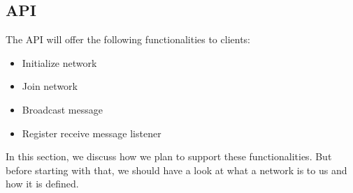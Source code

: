 \subsection{API}
	The API will offer the following functionalities to clients:
	\begin{itemize}
		\item {Initialize network}
		\item {Join network}
		\item {Broadcast message}
		\item {Register receive message listener}
	\end{itemize}
	
	In this section, we discuss how we plan to support these functionalities. But before starting with that, we should have a look at	what a network is to us and how it is defined.\\
